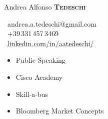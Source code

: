 \begin{minipage}[t]{0.33\textwidth} %
\colorbox{cvblue}{\begin{minipage}[t][5mm][t]{\textwidth}\null\hfill\null\end{minipage}}

\vspace{-.2ex} 						%
\colorbox{cvblue!90}{\color{white}  %
	\textwidth\relax		%
	\begin{minipage}[t][293mm][t]{0.82\textwidth}
	\raggedright
	\vspace*{2.5ex}

	\Large Andrea Alfonso \textbf{\textsc{Tedeschi}} \normalsize 

	\begin{center}
	\end{center}

	\vspace*{0.0ex} %


	\small %
	\MVAt\ {\small andrea.a.tedeschi@gmail.com} \\[0.4ex]
	\Telefon\ +39\,331\,457\,3469 \\[0.5ex]
	\faLinkedin\ \href{https://www.linkedin.com/in/aatedeschi/}{linkedin.com/in/aatedeschi/} \\[0.1ex]

	

	


	

	\begin{itemize}
		\item Public Speaking
		\item Cisco Academy
		\item Skill-a-bus
		\item Bloomberg Market Concepts
	\end{itemize}

	\end{minipage}%
	\textwidth\relax
} 									%
\end{minipage} 						%